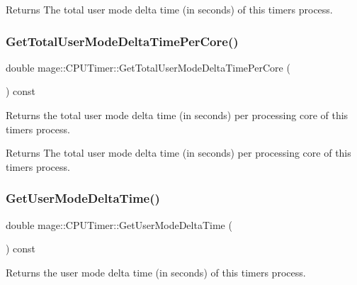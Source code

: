\begin{DoxyReturn}{Returns}
The total user mode delta time (in seconds) of this timer\textquotesingle{}s process. 
\end{DoxyReturn}
\hypertarget{classmage_1_1_c_p_u_timer_a72bf36dbc5a67f99251125aa6e5c19f6}{}\label{classmage_1_1_c_p_u_timer_a72bf36dbc5a67f99251125aa6e5c19f6} 
\subsubsection{\texorpdfstring{Get\+Total\+User\+Mode\+Delta\+Time\+Per\+Core()}{GetTotalUserModeDeltaTimePerCore()}}
{\footnotesize\ttfamily double mage\+::\+C\+P\+U\+Timer\+::\+Get\+Total\+User\+Mode\+Delta\+Time\+Per\+Core (\begin{DoxyParamCaption}{ }\end{DoxyParamCaption}) const}

Returns the total user mode delta time (in seconds) per processing core of this timer\textquotesingle{}s process.

\begin{DoxyReturn}{Returns}
The total user mode delta time (in seconds) per processing core of this timer\textquotesingle{}s process. 
\end{DoxyReturn}
\hypertarget{classmage_1_1_c_p_u_timer_a999022706e5fa8ff4ee8c25de4be0e81}{}\label{classmage_1_1_c_p_u_timer_a999022706e5fa8ff4ee8c25de4be0e81} 
\subsubsection{\texorpdfstring{Get\+User\+Mode\+Delta\+Time()}{GetUserModeDeltaTime()}}
{\footnotesize\ttfamily double mage\+::\+C\+P\+U\+Timer\+::\+Get\+User\+Mode\+Delta\+Time (\begin{DoxyParamCaption}{ }\end{DoxyParamCaption}) const}

Returns the user mode delta time (in seconds) of this timer\textquotesingle{}s process.

